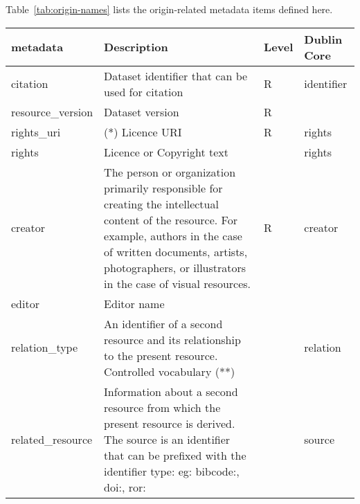 \documentclass[11pt,a4paper]{ivoa}
\begin{document}
Table~\ref{tab:origin-names} lists the origin-related metadata items
defined here.

\begin{table}
\begin{tabular}{|l|p{5cm}|l|l|}  \hline
\textbf{metadata} & \textbf{Description} & \textbf{Level} & \textbf{Dublin Core}\\ \hline
citation    & Dataset identifier that can be used for citation& R  & identifier\\ \hline
resource\_version  & Dataset version  & R & \\ \hline
rights\_uri        & (*) Licence URI & R & rights\\ \hline
rights             & Licence or Copyright text &  & rights\\ \hline
creator            & The person or organization primarily responsible for creating the
                     intellectual content of the resource.  For example, authors in the
                     case of written documents, artists, photographers, or illustrators in
                     the case of visual resources. & R & creator\\ \hline
editor             & Editor name &  & \\ \hline
relation\_type     & An identifier of a second resource and its relationship to the
                     present resource.
                     Controlled vocabulary (**)& & relation\\ \hline
related\_resource  & Information about a second resource from which the present resource
                     is derived. The source is an identifier that can be prefixed with the identifier type: eg: bibcode:, doi:, ror: &  & source\\ \hline

\end{tabular}
\end{table}
\end{document}
